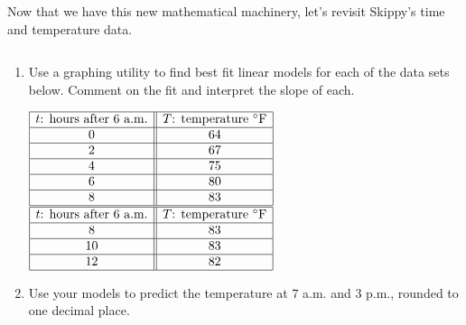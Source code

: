 \documentclass{ximera}
\begin{document}
Now that we have this new mathematical machinery, let's revisit Skippy's time and temperature data.
  
\begin{example} \label{timetempregressionex}  $~$
  
\begin{enumerate}
  
\item Use a graphing utility to find best fit linear models for each of the data sets below. Comment on the fit and interpret the slope of each.

\begin{center}
  

  
$\begin{array}{|c||c|}  \hline

 \text{$t$: hours after 6 a.m.}  & \text{$T$: temperature $^{\circ}$F} \\ \hline
 0 & 64  \\  \hline
 2 & 67  \\  \hline
 4 &  75  \\  \hline
 6 &  80 \\  \hline
 8 & 83  \\  \hline

\end{array}$\quad\quad
$\begin{array}{|c||c|}  \hline

 \text{$t$: hours after 6 a.m.}  & \text{$T$: temperature $^{\circ}$F} \\ \hline

 8 & 83  \\  \hline
 10 &  83 \\  \hline
 12 & 82  \\  \hline

\end{array}$ 
  

  
\end{center}

\item  Use your models to predict the temperature at $7$ a.m. and $3$ p.m., rounded to one decimal place.
  
\end{enumerate}

\begin{explanation}
  
\begin{enumerate}
  

\end{enumerate}
\end{explanation}
\end{example}
\end{document}

